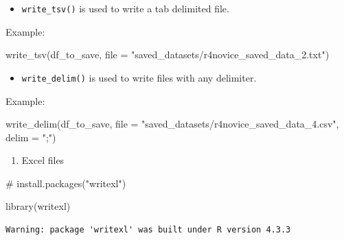 \documentclass[
  letterpaper,
  DIV=11,
  numbers=noendperiod]{scrreprt}
\newenvironment{Shaded}{\begin{snugshade}}{\end{snugshade}}
\newcommand{\AttributeTok}[1]{\textcolor[rgb]{0.40,0.45,0.13}{#1}}
\newcommand{\CommentTok}[1]{\textcolor[rgb]{0.37,0.37,0.37}{#1}}
\newcommand{\FunctionTok}[1]{\textcolor[rgb]{0.28,0.35,0.67}{#1}}
\newcommand{\NormalTok}[1]{\textcolor[rgb]{0.00,0.23,0.31}{#1}}
\newcommand{\StringTok}[1]{\textcolor[rgb]{0.13,0.47,0.30}{#1}}
\providecommand{\tightlist}{%
  \setlength{\itemsep}{0pt}\setlength{\parskip}{0pt}}\usepackage{longtable,booktabs,array}
\begin{document}
\begin{itemize}
\tightlist
\item
  \texttt{write\_tsv()} is used to write a tab delimited file.
\end{itemize}

Example:

\begin{Shaded}
\begin{Highlighting}[]
\FunctionTok{write\_tsv}\NormalTok{(df\_to\_save, }\AttributeTok{file =} \StringTok{"saved\_datasets/r4novice\_saved\_data\_2.txt"}\NormalTok{)}
\end{Highlighting}
\end{Shaded}

\begin{itemize}
\tightlist
\item
  \texttt{write\_delim()} is used to write files with any delimiter.
\end{itemize}

Example:

\begin{Shaded}
\begin{Highlighting}[]
\FunctionTok{write\_delim}\NormalTok{(df\_to\_save, }\AttributeTok{file =} \StringTok{"saved\_datasets/r4novice\_saved\_data\_4.csv"}\NormalTok{, }\AttributeTok{delim =} \StringTok{";"}\NormalTok{)}
\end{Highlighting}
\end{Shaded}

\begin{enumerate}
\def\labelenumi{\alph{enumi}.}
\setcounter{enumi}{1}
\tightlist
\item
  Excel files
\end{enumerate}

\begin{Shaded}
\begin{Highlighting}[]
\CommentTok{\# install.packages("writexl")}
\end{Highlighting}
\end{Shaded}

\begin{Shaded}
\begin{Highlighting}[]
\FunctionTok{library}\NormalTok{(writexl)}
\end{Highlighting}
\end{Shaded}

\begin{verbatim}
Warning: package 'writexl' was built under R version 4.3.3
\end{verbatim}
\end{document}
